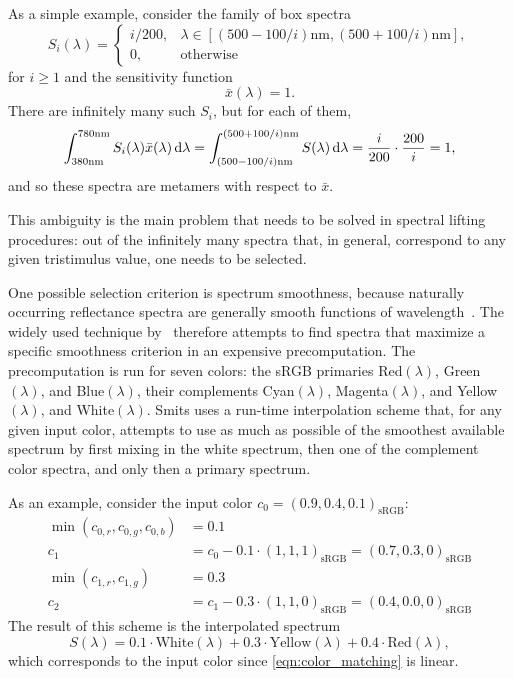 As a simple example, consider the family of box spectra
\begin{equation*}
    S_i(\lambda) = \begin{cases}
        i / 200, &\lambda \in [ (500-100/i)\unit{\nano\meter}, (500+100/i)\unit{\nano\meter}],\\
        0, &\text{otherwise}
    \end{cases}
\end{equation*}
for $i \geq 1 $ and the sensitivity function
\begin{equation*}
    \bar x(\lambda) = 1.
\end{equation*}
There are infinitely many such $S_i$, but for each of them,
\begin{equation*}
    \int_{380\unit{\nano\meter}}^{780\unit{\nano\meter}} S_i(\lambda) \bar x(\lambda)\d\lambda
    = 
    \int_{(500-100/i)\unit{\nano\meter}}^{(500+100/i)\unit{\nano\meter}} S(\lambda)\d\lambda
    = \frac{i}{200} \cdot \frac{200}{i} = 1,
\end{equation*}
and so these spectra are metamers with respect to $\bar x$.

This ambiguity is the main problem that needs to be solved in spectral
lifting procedures: out of the infinitely many spectra that, in general,
correspond to any given tristimulus value, one needs to be selected.

One possible selection criterion is spectrum smoothness, because naturally occurring
reflectance spectra are generally smooth functions of wavelength~\cite{maloney86}. 
The widely
used technique by~\textcite{smits99} therefore attempts to find spectra that
maximize a specific smoothness criterion in an expensive precomputation.
The precomputation is run for seven colors: the sRGB primaries 
Red$(\lambda)$, Green$(\lambda)$, and Blue$(\lambda)$, 
their complements
Cyan$(\lambda)$, Magenta$(\lambda)$, and Yellow$(\lambda)$, and White$(\lambda)$. 
Smits uses a run-time interpolation scheme
that, for any given input color, attempts to use as much as possible 
of the smoothest available spectrum by first mixing in the white spectrum, 
then one of the complement color spectra, and only then a primary spectrum.

As an example, consider the input color $c_0=(0.9, 0.4, 0.1)_\text{sRGB}$:
\begin{align*}
    \min(c_{0,r}, c_{0,g}, c_{0,b}) &= 0.1\\
    c_1 &= c_0 - 0.1\cdot(1,1,1)_\text{sRGB} = (0.7, 0.3, 0)_\text{sRGB}\\
    \min(c_{1,r}, c_{1,g}) &= 0.3\\
    c_2 &= c_1 - 0.3\cdot(1,1,0)_\text{sRGB} = (0.4, 0.0, 0)_\text{sRGB}
\end{align*}
The result of this scheme is the interpolated spectrum
\begin{equation}
    S(\lambda) = 0.1\cdot \text{White}(\lambda)
               + 0.3\cdot \text{Yellow}(\lambda)
               + 0.4\cdot \text{Red}(\lambda),
\end{equation}
which corresponds to the input color since \cref{eqn:color_matching} is linear.

